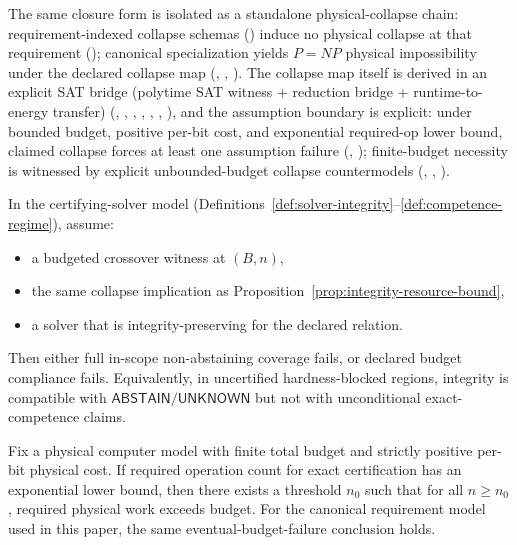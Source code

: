 The same closure form is isolated as a standalone physical-collapse chain: requirement-indexed collapse schemas () induce no physical collapse at that requirement (); canonical specialization yields \(P{=}NP\) physical impossibility under the declared collapse map (, , ). The collapse map itself is derived in an explicit SAT bridge (polytime SAT witness + reduction bridge + runtime-to-energy transfer) (, , , , , , ), and the assumption boundary is explicit: under bounded budget, positive per-bit cost, and exponential required-op lower bound, claimed collapse forces at least one assumption failure (, ); finite-budget necessity is witnessed by explicit unbounded-budget collapse countermodels (, , ).

\begin{proposition}\label{prop:crossover-policy}
In the certifying-solver model (Definitions~\ref{def:solver-integrity}--\ref{def:competence-regime}), assume:
\begin{itemize}
\item a budgeted crossover witness at $(B,n)$,
\item the same collapse implication as Proposition~\ref{prop:integrity-resource-bound},
\item a solver that is integrity-preserving for the declared relation.
\end{itemize}
Then either full in-scope non-abstaining coverage fails, or declared budget compliance fails.
Equivalently, in uncertified hardness-blocked regions, integrity is compatible with $\mathsf{ABSTAIN}/\mathsf{UNKNOWN}$ but not with unconditional exact-competence claims.
\end{proposition}

\begin{corollary}\label{cor:finite-budget-threshold-impossibility}
Fix a physical computer model with finite total budget and strictly positive per-bit physical cost.
If required operation count for exact certification has an exponential lower bound, then there exists a threshold \(n_0\) such that for all \(n \ge n_0\), required physical work exceeds budget.
For the canonical requirement model used in this paper, the same eventual-budget-failure conclusion holds.
\end{corollary}

